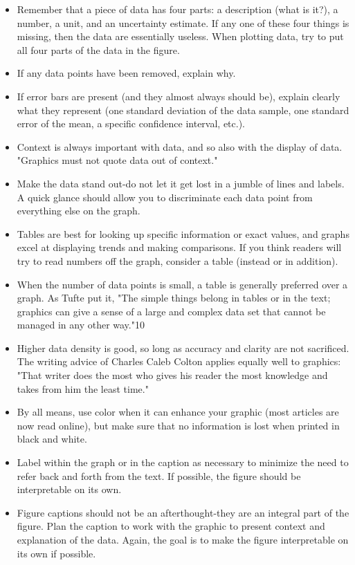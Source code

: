 \begin{itemize}
  \item Remember that a piece of data has four parts: a description (what is it?), a number, a unit, and an uncertainty estimate. If any one of these four things is missing, then the data are essentially useless. When plotting data, try to put all four parts of the data in the figure.
  \item If any data points have been removed, explain why.
  \item If error bars are present (and they almost always should be), explain clearly what they represent (one standard deviation of the data sample, one standard error of the mean, a specific confidence interval, etc.).
  \item Context is always important with data, and so also with the display of data. "Graphics must not quote data out of context."
  \item Make the data stand out-do not let it get lost in a jumble of lines and labels. A quick glance should allow you to discriminate each data point from everything else on the graph.
  \item Tables are best for looking up specific information or exact values, and graphs excel at displaying trends and making comparisons. If you think readers will try to read numbers off the graph, consider a table (instead or in addition).
  \item When the number of data points is small, a table is generally preferred over a graph. As Tufte put it, "The simple things belong in tables or in the text; graphics can give a sense of a large and complex data set that cannot be managed in any other way."10
  \item Higher data density is good, so long as accuracy and clarity are not sacrificed. The writing advice of Charles Caleb Colton applies equally well to graphics: "That writer does the most who gives his reader the most knowledge and takes from him the least time."
  \item By all means, use color when it can enhance your graphic (most articles are now read online), but make sure that no information is lost when printed in black and white.
  \item Label within the graph or in the caption as necessary to minimize the need to refer back and forth from the text. If possible, the figure should be interpretable on its own.
  \item Figure captions should not be an afterthought-they are an integral part of the figure. Plan the caption to work with the graphic to present context and explanation of the data. Again, the goal is to make the figure interpretable on its own if possible.

\end{itemize}
